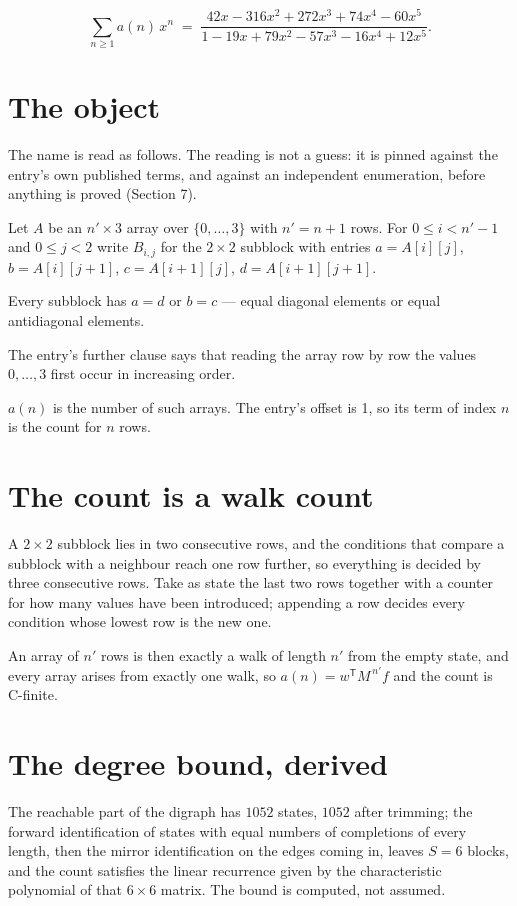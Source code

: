 \documentclass[11pt]{article}
\theoremstyle{definition}
\begin{document}
\[\sum_{n \ge 1} a(n)\,x^n \;=\; \frac{42x - 316x^{2} + 272x^{3} + 74x^{4} - 60x^{5}}{1 - 19x + 79x^{2} - 57x^{3} - 16x^{4} + 12x^{5}}.\]

\section{The object}

The name is read as follows. The reading is not a guess: it is pinned against the entry's own published terms, and against an independent enumeration, before anything is proved (Section 7).

Let $A$ be an $n' \times 3$ array over $\{0,\dots,3\}$ with $n' = n + 1$ rows. For $0 \le i < n'-1$ and $0 \le j < 2$ write $B_{i,j}$ for the $2\times2$ subblock with entries $a = A[i][j]$, $b = A[i][j{+}1]$, $c = A[i{+}1][j]$, $d = A[i{+}1][j{+}1]$.

Every subblock has $a = d$ or $b = c$ --- equal diagonal elements or equal antidiagonal elements.

The entry's further clause says that reading the array row by row the values $0,\dots,3$ first occur in increasing order.

$a(n)$ is the number of such arrays. The entry's offset is 1, so its term of index $n$ is the count for $n$ rows.

\section{The count is a walk count}

A $2\times2$ subblock lies in two consecutive rows, and the conditions that compare a subblock with a neighbour reach one row further, so everything is decided by three consecutive rows. Take as state the last two rows together with a counter for how many values have been introduced; appending a row decides every condition whose lowest row is the new one.

An array of $n'$ rows is then exactly a walk of length $n'$ from the empty state, and every array arises from exactly one walk, so $a(n) = w^{\mathsf T}M^{\,n'}f$ and the count is C-finite.

\section{The degree bound, derived}

The reachable part of the digraph has $1052$ states, $1052$ after trimming; the forward identification of states with equal numbers of completions of every length, then the mirror identification on the edges coming in, leaves $S = 6$ blocks, and the count satisfies the linear recurrence given by the characteristic polynomial of that $6\times6$ matrix. The bound is computed, not assumed.
\end{document}
